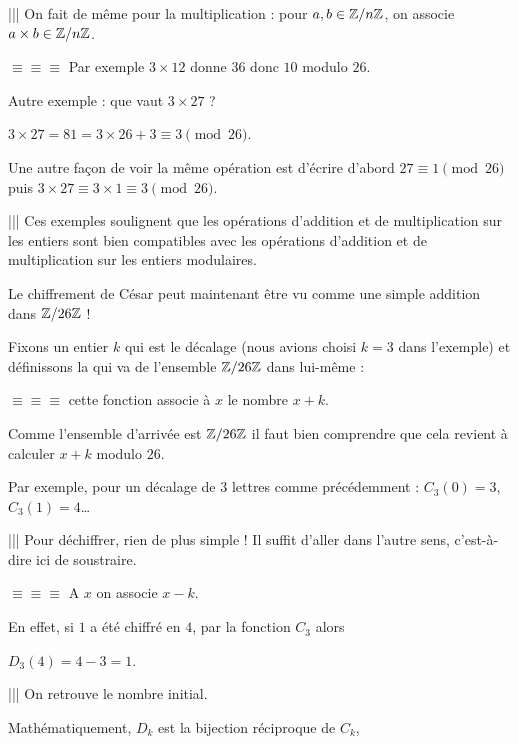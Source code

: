 \change
||| On fait de même pour la multiplication :
pour $a,b \in \mathbb{Z}/n\mathbb{Z}$, on associe $a \times b \in \mathbb{Z}/n\mathbb{Z}$.

\change
$\equiv \equiv \equiv$ Par exemple $3 \times 12$ donne $36$ donc $10$ modulo $26$.

\change
Autre exemple : que vaut $3 \times 27$ ?

$3 \times 27 = 81 = 3 \times 26 + 3 \equiv 3 \pmod{26}$.

\change
Une autre façon de voir la même opération est d'écrire d'abord 
$27 \equiv 1 \pmod{26}$ puis $3 \times 27 \equiv 3 \times 1 \equiv 3 \pmod{26}$.

||| Ces exemples soulignent que les opérations d'addition et de multiplication sur les entiers 
sont bien compatibles avec les opérations d'addition et de multiplication sur les entiers modulaires.

\diapo

Le chiffrement de César peut maintenant être vu comme une simple addition dans $\mathbb{Z}/26\mathbb{Z}$ !

Fixons un entier $k$ qui est le décalage (nous avions choisi $k=3$ dans l'exemple) 
et définissons la  
qui va de l'ensemble $\mathbb{Z}/26 \mathbb{Z}$ dans lui-même :

$\equiv \equiv \equiv$ cette fonction associe à $x$ le nombre $x+k$. 

Comme l'ensemble d'arrivée est $\mathbb{Z}/26 \mathbb{Z}$ il faut bien comprendre que cela revient à calculer  $x+k$ modulo $26$.

\change

Par exemple, pour un décalage de $3$ lettres comme précédemment : $C_3(0)=3$, $C_3(1)=4$\ldots

\change 

||| Pour déchiffrer, rien de plus simple ! Il suffit d'aller dans l'autre sens, c'est-à-dire ici de soustraire.

$\equiv \equiv \equiv$ A $x$ on associe $x-k$.

\change

En effet, si $1$ a été chiffré en $4$, par la fonction $C_3$ alors 

$D_3(4)=4-3=1$. 

||| On retrouve le nombre initial.

\diapo


Mathématiquement, $D_k$ est la bijection réciproque de $C_k$, 

